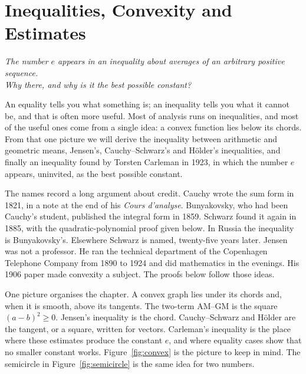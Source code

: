 \chapter{Inequalities, Convexity and Estimates}\label{ch:inequalities}

\begin{center}\itshape
The number $e$ appears in an inequality about averages of an arbitrary positive sequence.\\
Why there, and why is it the best possible constant?
\end{center}

An equality tells you what something is; an inequality tells you what it cannot be, and that is often more useful. Most of analysis runs on
inequalities, and most of the useful ones come from a single idea: a convex function lies below its chords. From that one picture we will derive the
inequality between arithmetic and geometric means, Jensen's, Cauchy--Schwarz's and H\"older's inequalities, and finally an inequality found by Torsten Carleman in
1923, in which the number $e$ appears, uninvited, as the best possible constant.

The names record a long argument about credit. Cauchy wrote the sum form in 1821, in a note at the end of his \emph{Cours d'analyse}. Bunyakovsky, who had been Cauchy's student, published the integral form in 1859. Schwarz found it again in 1885, with the quadratic-polynomial proof given below. In Russia the inequality is Bunyakovsky's. Elsewhere Schwarz is named, twenty-five years later. Jensen was not a professor. He ran the technical department of the Copenhagen Telephone Company from 1890 to 1924 and did mathematics in the evenings. His 1906 paper made convexity a subject. The proofs below follow those ideas.

One picture organises the chapter. A convex graph lies under its chords and, when it is smooth, above its tangents. The two-term AM--GM is the square $(a-b)^2\ge0$. Jensen's inequality is the chord. Cauchy--Schwarz and Hölder are the tangent, or a square, written for vectors. Carleman's inequality is the place where these estimates produce the constant $e$, and where equality cases show that no smaller constant works. Figure~\ref{fig:convex} is the picture to keep in mind. The semicircle in Figure~\ref{fig:semicircle} is the same idea for two numbers.


